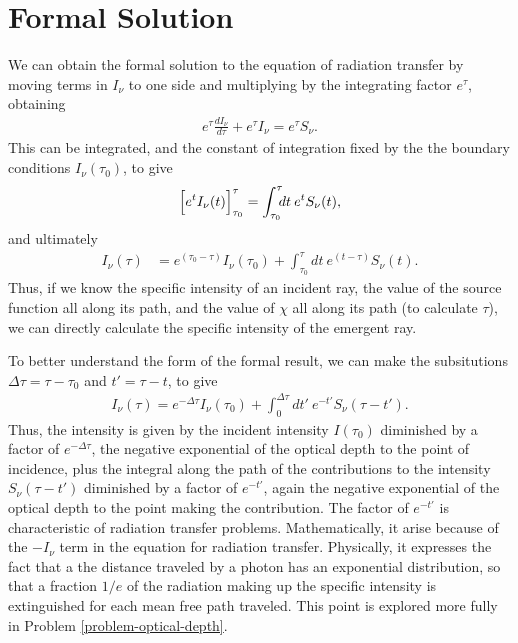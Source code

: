 \newslide

\section{Formal Solution}

We can obtain the formal solution to the equation of radiation transfer
by moving terms in $I_\nu$ to one side and multiplying by the
integrating factor $e^{\tau}$, obtaining
\begin{align}
e^{\tau} \frac{dI_\nu}{d\tau} + e^{\tau} I_\nu =
e^{\tau} S_\nu.
\end{align}
This can be integrated, and the constant of integration
fixed by the the boundary conditions $I_\nu(\tau_0)$, to
give
\begin{align}
\Bigl[e^t I_\nu(t)\Bigr]_{\tau_0}^{\tau} =
\int_{\tau_0}^{\tau}\!\!\!dt\:e^t S_\nu(t),
\end{align}
and ultimately
\begin{align}
I_\nu(\tau) &=
e^{(\tau_0-\tau)}I_\nu(\tau_0) + \int_{\tau_0}^{\tau}\!\!\!dt\:e^{(t-\tau)}S_\nu(t).
\end{align}
Thus, if we know the specific intensity of an incident ray,
the value of the source function all along its path, and the
value of $\chi$ all along its path (to calculate
$\tau$), we can directly calculate the specific intensity
of the emergent ray.

\newslide

To better understand the form of the formal result, we can
make the subsitutions $\Delta\tau = \tau -
\tau_0$ and $t' = \tau - t$, to give
\begin{align}
I_\nu(\tau) = e^{-\Delta\tau}I_\nu(\tau_0)
+
\int_0^{\Delta\tau}\!\!\!dt'\:e^{-t'}S_\nu(\tau -
t').
\end{align}
Thus, the intensity is given by the incident intensity $I(\tau_0)$
diminished by a factor of $e^{-\Delta\tau}$, the negative
exponential of the optical depth to the point of incidence, plus the
integral along the path of the contributions to the intensity
$S_\nu(\tau - t')$ diminished by a factor of $e^{-t'}$, again the
negative exponential of the optical depth to the point making the
contribution. The factor of $e^{-t'}$ is characteristic of radiation
transfer problems. Mathematically, it arise because of the $-I_\nu$ term
in the equation for radiation transfer. Physically, it expresses the
fact that a the distance traveled by a photon has an exponential
distribution, so that a fraction $1/e$ of the radiation making up the
specific intensity is extinguished for each mean free path traveled.
This point is explored more fully in Problem
\ref{problem-optical-depth}.

